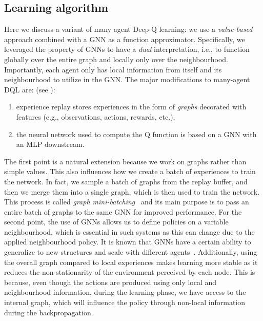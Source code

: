 \subsection{Learning algorithm}
%
Here we discuss a variant of many agent Deep-Q learning:
 we use a \emph{value-based} approach combined with a \ac{GNN} as a function approximator.
%
Specifically, we leveraged the property of \acp{GNN} to have a \emph{dual} interpretation, 
i.e., to function globally over the entire graph and locally only over the neighbourhood. 
Importantly, each agent only has local information from itself and its neighbourhood to utilize in the \ac{GNN}.
%
The major modifications to many-agent DQL are: (see ): 
\begin{enumerate}
  \item experience replay stores experiences in the form of \emph{graphs} decorated with features (e.g., observations, actions, rewards, etc.),
  \item the neural network used to compute the Q function is based on a \ac{GNN} with an \ac{MLP} downstream.
\end{enumerate}
The first point is a natural extension because we work on graphs rather than simple values.
This also influences how we create a batch of experiences to train the network.
 In fact, we sample a batch of graphs from the replay buffer,
 and then we merge them into a single graph,
 which is then used to train the network.
 This process is called \emph{graph mini-batching}~\cite{DBLP:journals/corr/abs-1903-02428,wang2019deep}
 and its main purpose is to pass an entire batch of graphs to the same \ac{GNN} for improved performance.
%
For the second point,
 the use of \acp{GNN} allows us to define policies on a variable neighbourhood, which is essential in such systems as this can change due to the applied neighbourhood policy.
 It is known that \acp{GNN} have a certain ability to generalize to new structures and scale with different agents~\cite{DBLP:journals/aiopen/ZhouCHZYLWLS20,DBLP:conf/nips/KnyazevTA19}. 
% 
Additionally, 
 using the overall graph compared to local experiences makes learning more stable as it reduces the non-stationarity of the environment perceived by each node.
% 
This is because, even though the actions are produced using only local and neighbourhood information, 
 during the learning phase, we have access to the internal graph, 
 which will influence the policy through non-local information 
 during the backpropagation.
%
